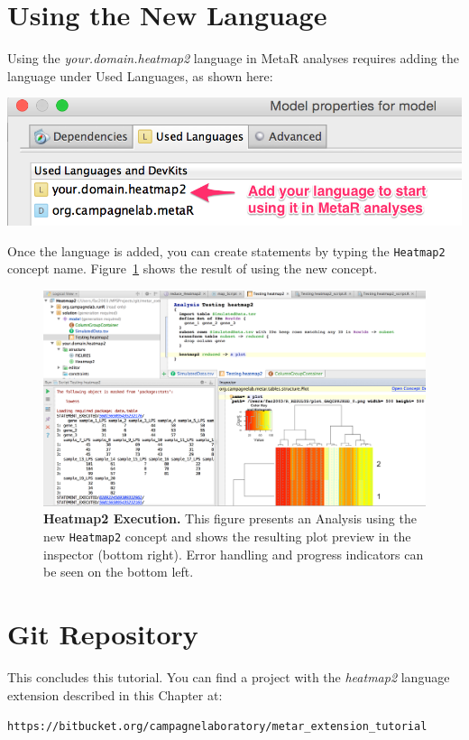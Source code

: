 \section{Using the New Language}
Using the \textit{your.domain.heatmap2} language in MetaR analyses  requires adding the language under Used Languages, as shown here:

  \includegraphics[width=\figWidthNarrow]{figures/LanguageExtensionUsedLanguages.png}

Once the language is added, you can create statements by typing the \texttt{Heatmap2} concept name. Figure~\ref{fig:Heatmap2_Execution} shows the result of using the new concept. 

\begin{figure}[h!tbp]
  \centering
  \includegraphics[width=\figWidthWide]{figures/Heatmap2_Execution.png}
\caption[Heatmap2 Execution.]{\textbf{Heatmap2 Execution.} This figure presents an Analysis using the new \texttt{Heatmap2} concept and shows the resulting plot preview in the inspector (bottom right). Error handling and progress indicators can be seen on the bottom left.}
\label{fig:Heatmap2_Execution}
\end{figure}



\section{Git Repository}
This concludes this tutorial. You can find a project with the \textit{heatmap2} language extension described in this Chapter at: \newline
\begin{flushright}
\texttt{https://bitbucket.org/\allowbreak{}campagnelaboratory\allowbreak{}/}\newline\texttt{metar\allowbreak{}\_extension\allowbreak{}\_tutorial}
\end{flushright}

